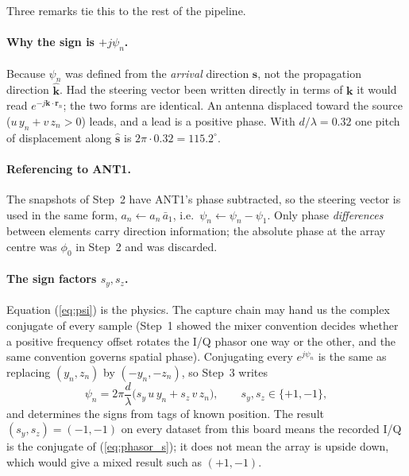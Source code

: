\documentclass[11pt,a4paper]{article}
\newcommand{\vect}[1]{\mathbf{#1}}
\newcommand{\uv}[1]{\hat{\mathbf{#1}}}
\begin{document}
Three remarks tie this to the rest of the pipeline.

\paragraph{Why the sign is $+j\psi_n$.} Because $\psi_n$ was defined from the \emph{arrival} direction $\uv s$, not the propagation direction $\uv k$. Had the steering vector been written directly in terms of $\vect k$ it would read $e^{-j\vect k\cdot\vect r_n}$; the two forms are identical. An antenna displaced toward the source ($u\,y_n + v\,z_n > 0$) leads, and a lead is a positive phase. With $d/\lambda = 0.32$ one pitch of displacement along $\uv s$ is $2\pi\cdot 0.32 = 115.2^\circ$.

\paragraph{Referencing to ANT1.} The snapshots of Step~2 have ANT1's phase subtracted, so the steering vector is used in the same form, $a_n \leftarrow a_n\,\bar a_1$, i.e.\ $\psi_n \leftarrow \psi_n - \psi_1$. Only phase \emph{differences} between elements carry direction information; the absolute phase at the array centre was $\phi_0$ in Step~2 and was discarded.

\paragraph{The sign factors $s_y, s_z$.} Equation (\ref{eq:psi}) is the physics. The capture chain may hand us the complex conjugate of every sample (Step~1 showed the mixer convention decides whether a positive frequency offset rotates the I/Q phasor one way or the other, and the same convention governs spatial phase). Conjugating every $e^{j\psi_n}$ is the same as replacing $(y_n, z_n)$ by $(-y_n, -z_n)$, so Step~3 writes
\[
  \psi_n = 2\pi\frac{d}{\lambda}\big(s_y\,u\,y_n + s_z\,v\,z_n\big), \qquad s_y, s_z \in \{+1, -1\},
\]
and determines the signs from tags of known position. The result $(s_y, s_z) = (-1, -1)$ on every dataset from this board means the recorded I/Q is the conjugate of (\ref{eq:phasor_s}); it does not mean the array is upside down, which would give a mixed result such as $(+1, -1)$.
\end{document}
